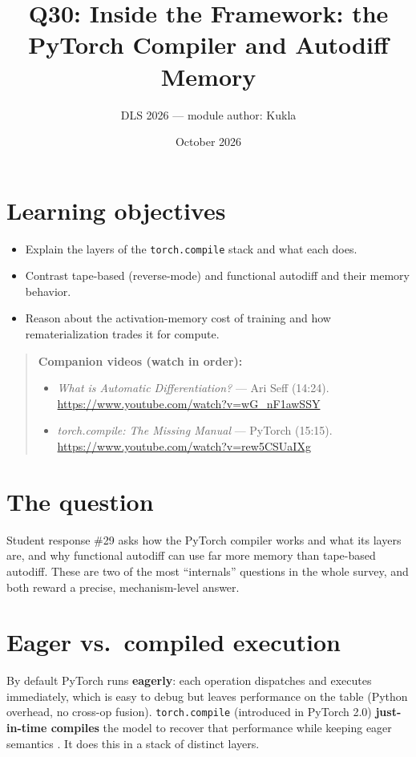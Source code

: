 \documentclass[11pt]{article}
\title{Q30: Inside the Framework: the PyTorch Compiler and Autodiff Memory}
\author{DLS 2026 --- module author: Kukla}
\date{October 2026}
\begin{document}
\maketitle

\section*{Learning objectives}
\begin{itemize}[leftmargin=1.4em]
\item Explain the layers of the \texttt{torch.compile} stack and what each does.
\item Contrast tape-based (reverse-mode) and functional autodiff and their memory behavior.
\item Reason about the activation-memory cost of training and how rematerialization trades it for compute.
\end{itemize}

\begin{quote}\small\textbf{Companion videos (watch in order):}\begin{itemize}\setlength\itemsep{0pt}\item \emph{What is Automatic Differentiation?} --- Ari Seff (14:24). \url{https://www.youtube.com/watch?v=wG_nF1awSSY}\item \emph{torch.compile: The Missing Manual} --- PyTorch (15:15). \url{https://www.youtube.com/watch?v=rew5CSUaIXg}\end{itemize}\end{quote}

\section{The question}
Student response \#29 asks how the PyTorch compiler works and what its layers are, and why functional
autodiff can use far more memory than tape-based autodiff. These are two of the most ``internals'' questions
in the whole survey, and both reward a precise, mechanism-level answer.

\section{Eager vs.\ compiled execution}
By default PyTorch runs \textbf{eagerly}: each operation dispatches and executes immediately, which is easy
to debug but leaves performance on the table (Python overhead, no cross-op fusion). \texttt{torch.compile}
(introduced in PyTorch 2.0) \textbf{just-in-time compiles} the model to recover that performance while
keeping eager semantics \citep{ansel2024pytorch2}. It does this in a stack of distinct layers.
\end{document}
